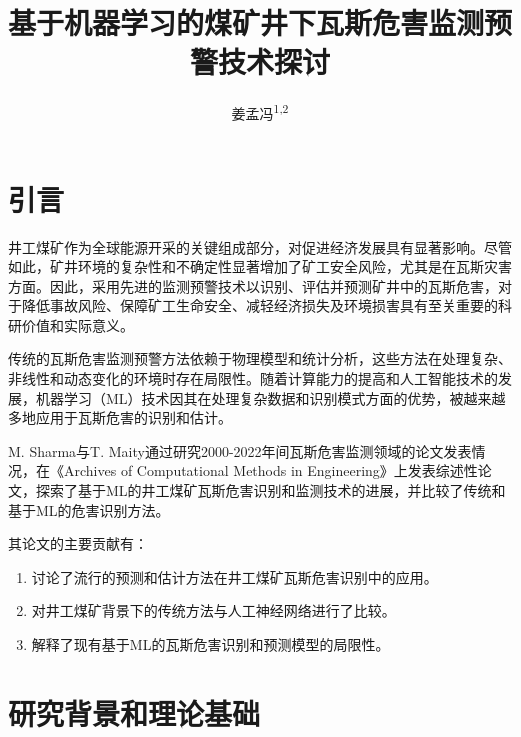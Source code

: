 \documentclass[lang=cn,a4paper,citestyle=gb7714-2015, bibstyle=gb7714-2015]{elegantpaper}
\title{基于机器学习的煤矿井下瓦斯危害监测预警技术探讨}
\author{姜孟冯\textsuperscript{1,2}}
\institute{(1.中国矿业大学,徐州;\ 2.应急管理部信息研究院,北京)}
\date{\zhtoday}
\newcommand{\mycite}[1]{\textsuperscript{\parencite{#1}}}
\begin{document}
    \maketitle

    \section{引言}
    井工煤矿作为全球能源开采的关键组成部分，对促进经济发展具有显著影响。尽管如此，矿井环境的复杂性和不确定性显著增加了矿工安全风险，尤其是在瓦斯灾害方面。因此，采用先进的监测预警技术以识别、评估并预测矿井中的瓦斯危害，对于降低事故风险、保障矿工生命安全、减轻经济损失及环境损害具有至关重要的科研价值和实际意义。

    传统的瓦斯危害监测预警方法依赖于物理模型和统计分析，这些方法在处理复杂、非线性和动态变化的环境时存在局限性。随着计算能力的提高和人工智能技术的发展，机器学习（ML）技术因其在处理复杂数据和识别模式方面的优势，被越来越多地应用于瓦斯危害的识别和估计。

    M. Sharma与T. Maity通过研究2000-2022年间瓦斯危害监测领域的论文发表情况，在《Archives of Computational Methods in Engineering》上发表综述性论文\mycite{Sharma2024}，探索了基于ML的井工煤矿瓦斯危害识别和监测技术的进展，并比较了传统和基于ML的危害识别方法。

    其论文的主要贡献有：
    \begin{enumerate}
        \item     讨论了流行的预测和估计方法在井工煤矿瓦斯危害识别中的应用。
        \item     对井工煤矿背景下的传统方法与人工神经网络进行了比较。
        \item     解释了现有基于ML的瓦斯危害识别和预测模型的局限性。
    \end{enumerate}

    \section{研究背景和理论基础}
\end{document}
